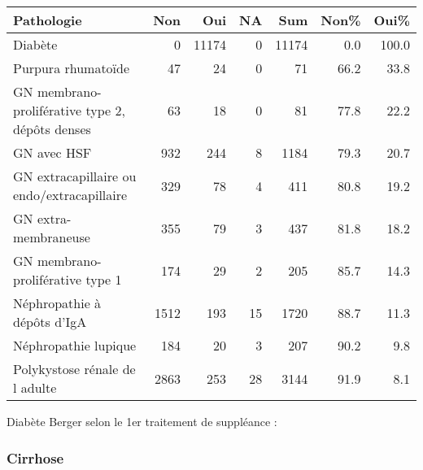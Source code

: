 \documentclass[11pt,a4paper]{article}\usepackage[]{graphicx}\usepackage[]{color}
\begin{document}
\begin{table}[H]
\centering
\begin{tabular}{lrrrrrr}
  \hline
Pathologie & Non & Oui & NA & Sum & Non\% & Oui\% \\ 
  \hline
Diabète &  0 & 11174 &  0 & 11174 & 0.0 & 100.0 \\ 
  Purpura rhumatoïde & 47 & 24 &  0 & 71 & 66.2 & 33.8 \\ 
  GN membrano-proliférative type 2, dépôts denses & 63 & 18 &  0 & 81 & 77.8 & 22.2 \\ 
  GN avec HSF & 932 & 244 &  8 & 1184 & 79.3 & 20.7 \\ 
  GN extracapillaire ou endo/extracapillaire & 329 & 78 &  4 & 411 & 80.8 & 19.2 \\ 
  GN extra-membraneuse & 355 & 79 &  3 & 437 & 81.8 & 18.2 \\ 
  GN membrano-proliférative type 1 & 174 & 29 &  2 & 205 & 85.7 & 14.3 \\ 
  Néphropathie à dépôts d'IgA & 1512 & 193 & 15 & 1720 & 88.7 & 11.3 \\ 
  Néphropathie lupique & 184 & 20 &  3 & 207 & 90.2 & 9.8 \\ 
  Polykystose rénale de l adulte & 2863 & 253 & 28 & 3144 & 91.9 & 8.1 \\ 
   \hline
\end{tabular}
\end{table}

% 
% 
% 
% 
% 

Diabète Berger selon le 1er traitement de suppléance :



\subsubsection*{Cirrhose}
\end{document}
